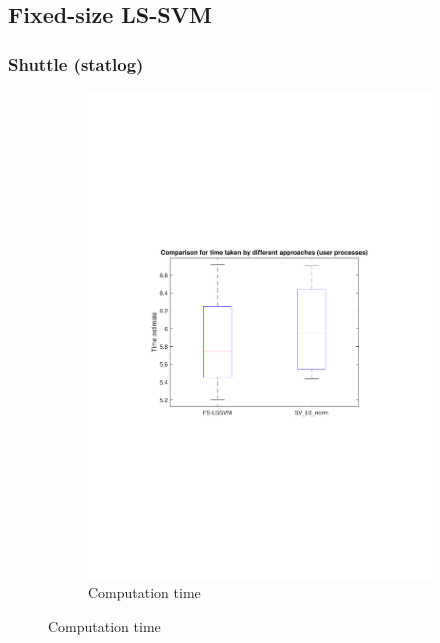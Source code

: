 \documentclass{article}
\begin{document}
        
    \subsection{Fixed-size LS-SVM}
    
    
        \subsubsection{Shuttle (statlog)}
            
            \begin{figure}[h]
             \centering
             \begin{subfigure}[b]{0.3\textwidth}
                 \centering
                 \includegraphics[width=\textwidth]{Assignment 3/figures/1_3/computation_time_comparison.pdf}
                 \caption{Computation time}
                 \label{fig:l0computation_time}

\end{subfigure}
\end{figure}
\end{document}
